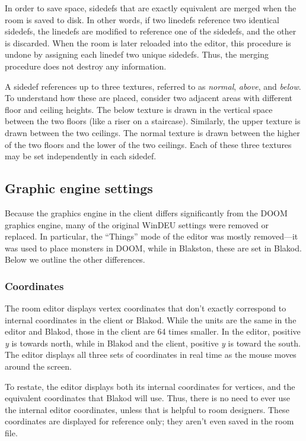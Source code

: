 In order to save space, sidedefs that are exactly equivalent are
merged when the room is saved to disk.  In other words, if two
linedefs reference two identical sidedefs, the linedefs are modified
to reference one of the sidedefs, and the other is discarded.  When
the room is later reloaded into the editor, this procedure is undone
by assigning each linedef two unique sidedefs.  Thus, the merging
procedure does not destroy any information.

A sidedef references up to three textures, referred to as {\em
normal}, {\em above}, and {\em below}.  To understand how these are
placed, consider two adjacent areas with different floor and ceiling
heights.  The below texture is drawn in the vertical space between the
two floors (like a riser on a staircase).  Similarly, the upper
texture is drawn between the two ceilings.  The normal texture is
drawn between the higher of the two floors and the lower of the two
ceilings.  Each of these three textures may be set independently in
each sidedef.

\subsection{Graphic engine settings}

Because the graphics engine in the client differs significantly from
the DOOM graphics engine, many of the original WinDEU settings were
removed or replaced.  In particular, the ``Things'' mode of the editor
was mostly removed---it was used to place monsters in DOOM, while in
Blakston, these are set in Blakod.  Below we outline the other
differences.

\subsubsection{Coordinates}

The room editor displays vertex coordinates that don't exactly
correspond to internal coordinates in the client or Blakod.  While the
units are the same in the editor and Blakod, those in the client are
64 times smaller.  In the editor, positive {\em y} is towards north,
while in Blakod and the client, positive {\em y} is toward the south.
The editor displays all three sets of coordinates in real time as the
mouse moves around the screen.

To restate, the editor displays both its internal coordinates for
vertices, and the equivalent coordinates that Blakod will use.  Thus,
there is no need to ever use the internal editor coordinates, unless
that is helpful to room designers.  These coordinates are displayed
for reference only; they aren't even saved in the room file.

